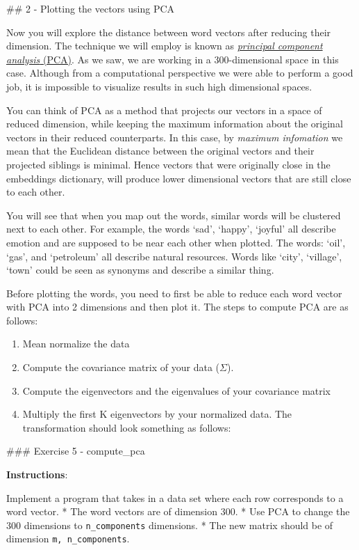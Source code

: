 \documentclass[11pt]{article}
\providecommand{\tightlist}{%
      \setlength{\itemsep}{0pt}\setlength{\parskip}{0pt}}
\begin{document}
    \#\# 2 - Plotting the vectors using PCA

Now you will explore the distance between word vectors after reducing
their dimension. The technique we will employ is known as
\href{https://en.wikipedia.org/wiki/Principal_component_analysis}{\emph{principal
component analysis} (PCA)}. As we saw, we are working in a
300-dimensional space in this case. Although from a computational
perspective we were able to perform a good job, it is impossible to
visualize results in such high dimensional spaces.

You can think of PCA as a method that projects our vectors in a space of
reduced dimension, while keeping the maximum information about the
original vectors in their reduced counterparts. In this case, by
\emph{maximum infomation} we mean that the Euclidean distance between
the original vectors and their projected siblings is minimal. Hence
vectors that were originally close in the embeddings dictionary, will
produce lower dimensional vectors that are still close to each other.

You will see that when you map out the words, similar words will be
clustered next to each other. For example, the words `sad', `happy',
`joyful' all describe emotion and are supposed to be near each other
when plotted. The words: `oil', `gas', and `petroleum' all describe
natural resources. Words like `city', `village', `town' could be seen as
synonyms and describe a similar thing.

Before plotting the words, you need to first be able to reduce each word
vector with PCA into 2 dimensions and then plot it. The steps to compute
PCA are as follows:

\begin{enumerate}
\def\labelenumi{\arabic{enumi}.}
\tightlist
\item
  Mean normalize the data
\item
  Compute the covariance matrix of your data (\(\Sigma\)).
\item
  Compute the eigenvectors and the eigenvalues of your covariance matrix
\item
  Multiply the first K eigenvectors by your normalized data. The
  transformation should look something as follows:
\end{enumerate}

    \#\#\# Exercise 5 - compute\_pca

\textbf{Instructions}:

Implement a program that takes in a data set where each row corresponds
to a word vector. * The word vectors are of dimension 300. * Use PCA to
change the 300 dimensions to \texttt{n\_components} dimensions. * The
new matrix should be of dimension \texttt{m,\ n\_components}.
\end{document}
